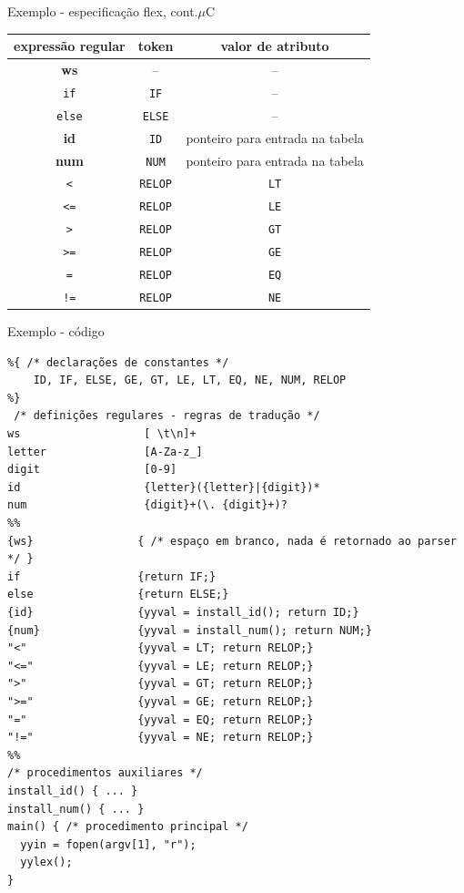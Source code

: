 \begin{frame}{Exemplo - especificação flex, cont.}{$\mu$C}
  \small
  \center
  \begin{tabular}{c|c|c}
    \toprule
    \bf\color{blue} expressão regular
    &\bf\color{blue}  token
    &\bf\color{blue} valor de atributo \\
    \midrule
    {\bf ws} &  --      & -- \\
    {\tt if}   & {\tt IF}  & -- \\
    {\tt else}   & {\tt ELSE}  & -- \\
    {\bf id}   & {\tt ID}  & ponteiro para entrada na tabela \\
    {\bf num}   & {\tt NUM}  & ponteiro para entrada na tabela \\
    {\tt <}   & {\tt RELOP} & {\tt LT} \\
    {\tt <=}   & {\tt RELOP} & {\tt LE} \\
    {\tt >}   & {\tt RELOP} & {\tt GT} \\
    {\tt >=}   & {\tt RELOP} & {\tt GE} \\
    {\tt =}   & {\tt RELOP} & {\tt EQ} \\
    {\tt !=}   & {\tt RELOP} & {\tt NE} \\
    \bottomrule
   \end{tabular}
 \end{frame}

\begin{frame}[fragile]{Exemplo - código}
 \tiny
\begin{lstlisting}
%{ /* declarações de constantes */
    ID, IF, ELSE, GE, GT, LE, LT, EQ, NE, NUM, RELOP
%}
 /* definições regulares - regras de tradução */
ws                   [ \t\n]+
letter               [A-Za-z_]
digit                [0-9]
id                   {letter}({letter}|{digit})*
num                  {digit}+(\. {digit}+)?
%%
{ws}                { /* espaço em branco, nada é retornado ao parser */ }
if                  {return IF;}
else                {return ELSE;}
{id}                {yyval = install_id(); return ID;}
{num}               {yyval = install_num(); return NUM;}
"<"                 {yyval = LT; return RELOP;}
"<="                {yyval = LE; return RELOP;}
">"                 {yyval = GT; return RELOP;}
">="                {yyval = GE; return RELOP;}
"="                 {yyval = EQ; return RELOP;}
"!="                {yyval = NE; return RELOP;}
%%
/* procedimentos auxiliares */
install_id() { ... }
install_num() { ... }
main() { /* procedimento principal */
  yyin = fopen(argv[1], "r");
  yylex();
}
\end{lstlisting}
\end{frame}

